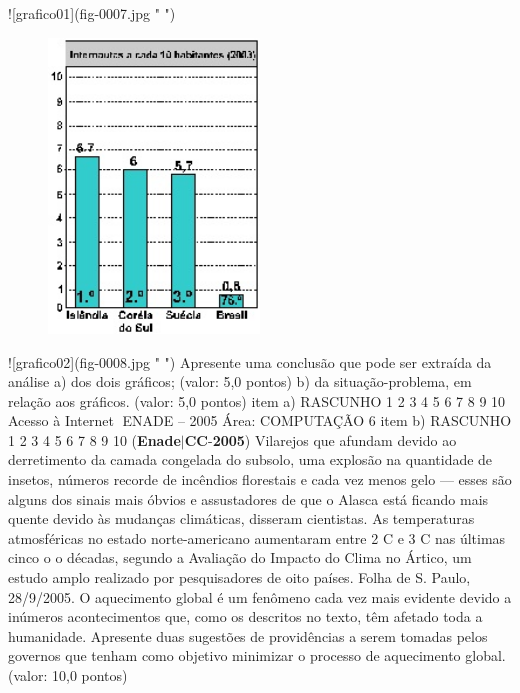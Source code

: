 \documentclass{exam}
\begin{document}
\begin{questions}
\begin{figure}[H]
\begin{center}
		\caption{ }
	\end{center}
\end{figure}
![grafico01](fig-0007.jpg " ")
\begin{figure}[H]
	\begin{center}
		\includegraphics[width=0.5\textwidth]{CIENCIA_DA_COMPUTACAO_Prova2005-utf8_figuras/fig-0008.jpg}
		\caption{ }
	\end{center}
\end{figure}
![grafico02](fig-0008.jpg " ")
Apresente uma conclusão que pode ser extraída da análise
a) dos dois gráficos; (valor: 5,0 pontos)
b) da situação-problema, em relação aos gráficos. (valor: 5,0 pontos)
item a) RASCUNHO
1
2
3
4
5
6
7
8
9
10
Acesso à Internet
ENADE – 2005 Área: COMPUTAÇÃO 6
item b) RASCUNHO
1
2
3
4
5
6
7
8
9
10
\question (\textbf{Enade}$|$\textbf{CC}-\textbf{2005}) Vilarejos que afundam devido ao derretimento da camada congelada do subsolo, uma explosão na
quantidade de insetos, números recorde de incêndios florestais e cada vez menos gelo — esses são alguns dos
sinais mais óbvios e assustadores de que o Alasca está ficando mais quente devido às mudanças climáticas,
disseram cientistas.
As temperaturas atmosféricas no estado norte-americano aumentaram entre 2 C e 3 C nas últimas cinco
o o
décadas, segundo a Avaliação do Impacto do Clima no Ártico, um estudo amplo realizado por pesquisadores
de oito países.
Folha de S. Paulo, 28/9/2005.
O aquecimento global é um fenômeno cada vez mais evidente devido a inúmeros acontecimentos que, como os descritos no texto, têm
afetado toda a humanidade. Apresente duas sugestões de providências a serem tomadas pelos governos que tenham como objetivo
minimizar o processo de aquecimento global. (valor: 10,0 pontos)

\end{questions}
\end{document}
